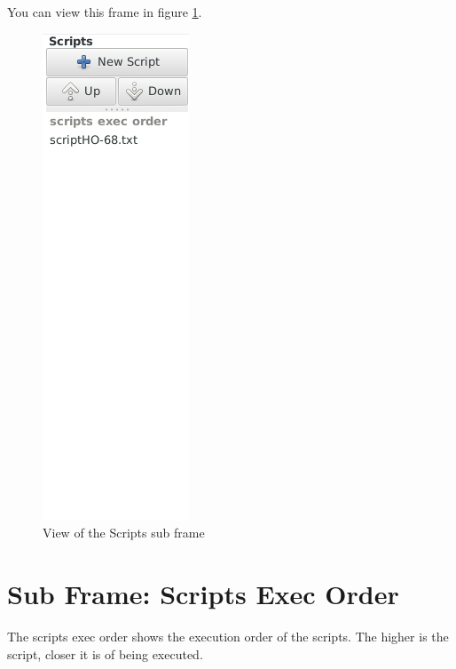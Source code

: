 \documentclass[pdftex,11pt,a4paper,titlepage]{report}
\begin{document}
You can view this frame in figure \ref{ScriptsFrame}.
\begin{figure}[h]
\centering
\includegraphics[scale=0.6]{../images/ScriptsFrame.png}
\caption{View of the Scripts sub frame}
\label{ScriptsFrame}
\end{figure}
\section{Sub Frame: Scripts Exec Order}
The scripts exec order shows the execution order of the scripts. The higher is the script, closer it is of being executed.
\end{document}
